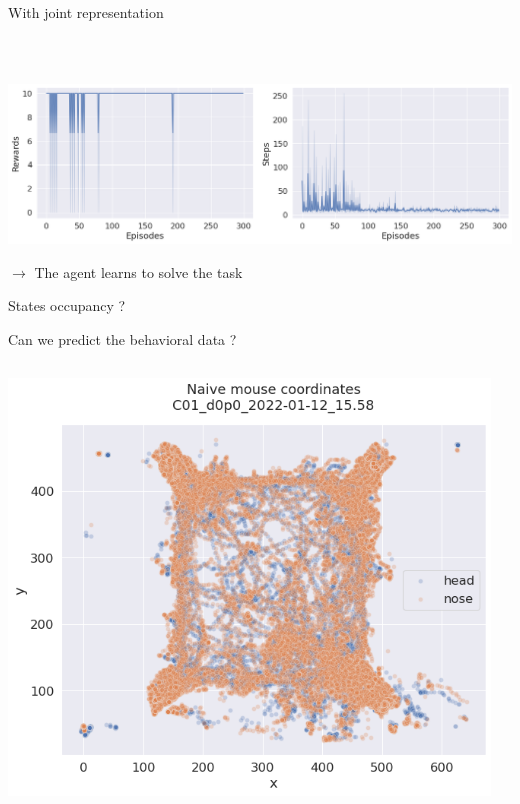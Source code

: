 \documentclass[bigger]{beamer}
\begin{document}
\begin{frame}[label={sec:orga888afd}]{With joint representation}
\begin{columns}
\begin{column}{0.5\columnwidth}
\begin{center}
\end{center}
\end{column}
\end{columns}
\begin{block}{~}
\vspace{-2em}
\begin{center}
\includegraphics[height=0.4\textheight]{img/rewards-steps-allo-joint-repr.png}
\end{center}
\(\to\) The agent learns to solve the task
\end{block}
\end{frame}
\begin{frame}[label={sec:org98bdd0b}]{States occupancy ?}
\end{frame}
\begin{frame}[label={sec:org1b8d41a}]{Can we predict the behavioral data ?}
\begin{columns}
\begin{column}{0.5\columnwidth}
\begin{center}
\includegraphics[width=\textwidth]{img/naive-mouse-coords.png}
\end{center}
\end{column}
\begin{column}{0.5\columnwidth}
\end{column}
\end{columns}
\end{frame}
\end{document}
